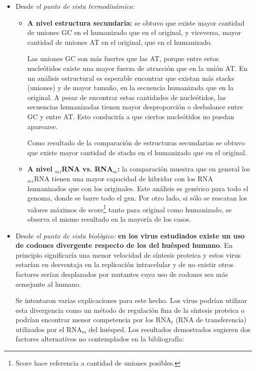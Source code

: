 \begin{itemize}
    \item Desde \emph{el punto de vista termodinámico:}
        \begin{itemize}
        \item \textbf{A nivel estructura secundaria:} se obtuvo que existe mayor cantidad de uniones GC en el humanizado que en el original, y viceversa, mayor cantidad de uniones AT en el original, que en el humanizado. 
        \par Las uniones GC son más fuertes que las AT, porque entre estos nucleótidos existe una mayor fuerza de atracción que en la unión AT. En un análisis estructural es esperable encontrar que existan más stacks (uniones) y de mayor tamaño, en la secuencia humanizada que en la original. A pesar de encontrar estas cantidades de nucleótidos, las secuencias humanizadas tienen mayor desproporción o desbalance entre GC y entre AT. Esto conduciría a que ciertos nucleótidos no puedan aparearse.

        \par Como resultado de la comparación de estructuras secundarias se obtuvo que existe mayor cantidad de stacks en el humanizado que en el original.

        \item \textbf{A nivel $_m$$_i$RNA vs. RNA$_m$:} la comparación muestra que en general los $_m$$_i$RNA tienen una mayor capacidad de hibridar con los RNA humanizados que con los originales. Este análisis es genérico para todo el genoma, donde se barre todo el gen. Por otro lado, si sólo se rescatan los valores máximos de score\footnote{Score hace referencia a cantidad de uniones posibles.} tanto para original como humanizado, se observa el mismo resultado en la mayoría de los casos.
        \end{itemize}
    \item Desde \emph{el punto de vista biológico:} \textbf{en los virus estudiados existe un uso de codones divergente respecto de los del huésped humano}. En principio significaría una menor velocidad de síntesis proteica y estos virus estarían en desventaja en la replicación intracelular y de no existir otros factores serían desplazados por mutantes cuyo uso de codones sea más semejante al humano.

    \par Se intentaron varias explicaciones para este hecho. Los virus podrían utilizar esta divergencia como un método de regulación fina de la síntesis proteica o podrían encontrar menor competencia por los RNA$_t$ (RNA de transferencia) utilizados por el RNA$_m$ del huésped. Los resultados demostrados sugieren dos factores alternativos no contemplados en la bibliografía:


\end{itemize}
